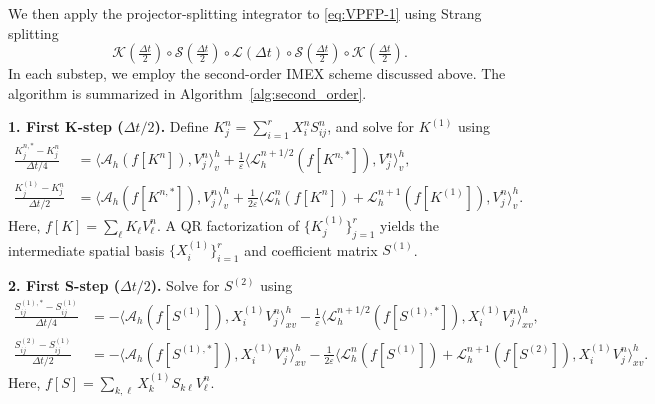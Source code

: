 \documentclass[]{article}
\numberwithin{equation}{section}
\begin{document}
We then apply the projector-splitting integrator to \eqref{eq:VPFP-1} using Strang splitting
\[\mathcal{K}(\tfrac{\Delta t}{2}) \circ \mathcal{S}(\tfrac{\Delta t}{2}) \circ \mathcal{L}(\Delta t) \circ \mathcal{S}(\tfrac{\Delta t}{2}) \circ \mathcal{K}(\tfrac{\Delta t}{2}).\]
In each substep, we employ the second-order IMEX scheme discussed above. The algorithm is summarized in Algorithm~\ref{alg:second_order}.


\medskip
\noindent\textbf{1. First K-step ($\Delta t/2$).}
Define $K^n_j = \sum_{i=1}^r X^n_i S^n_{ij}$, and solve for $K^{(1)}$ using
\begin{align}
    \frac{K^{n,\ast}_{j} - K^{n}_{j}}{\Delta t/4} &= \langle \mathcal{A}_h(f[K^{n}]),V^n_j\rangle_v^h + \frac{1}{\varepsilon}\langle \mathcal{L}_{h}^{n+1/2}(f[K^{n,\ast}]),V^n_j\rangle_v^h, \\
    \frac{K^{(1)}_{j} - K^{n}_{j}}{\Delta t/2} &= \langle \mathcal{A}_h(f[K^{n,\ast}]),V^n_j\rangle_v^h + \frac{1}{2\varepsilon}\langle \mathcal{L}_{h}^{n}(f[K^{n}]) + \mathcal{L}_{h}^{n+1}(f[K^{(1)}]),V^n_j\rangle_v^h.
\end{align}
Here, $f[K] = \sum_{\ell} K_\ell V^n_\ell$. A QR factorization of $\{K^{(1)}_j\}_{j=1}^{r}$ yields the intermediate spatial basis $\{X^{(1)}_i\}_{i=1}^{r}$ and coefficient matrix $S^{(1)}$.

\noindent\textbf{2. First S-step ($\Delta t/2$).}
Solve for $S^{(2)}$ using
\begin{align}
    \frac{S^{(1),\ast}_{ij} - S^{(1)}_{ij}}{\Delta t/4} &= - \big\langle \mathcal{A}_h(f[S^{(1)}]),X^{(1)}_i V^n_j \big\rangle_{xv}^h - \frac{1}{\varepsilon}\big\langle \mathcal{L}_{h}^{n+1/2}(f[S^{(1),\ast}]),X^{(1)}_i V^n_j \big\rangle_{xv}^h, \\
    \frac{S^{(2)}_{ij} - S^{(1)}_{ij}}{\Delta t/2} &= - \big\langle \mathcal{A}_h(f[S^{(1),\ast}]),X^{(1)}_i V^n_j \big\rangle_{xv}^h - \frac{1}{2\varepsilon}\big\langle \mathcal{L}_{h}^{n}(f[S^{(1)}]) + \mathcal{L}_{h}^{n+1}(f[S^{(2)}]),X^{(1)}_i V^n_j \big\rangle_{xv}^h.
\end{align}
Here, $f[S] = \sum_{k,\ell} X^{(1)}_k S_{k\ell} V^n_\ell$.
\end{document}
